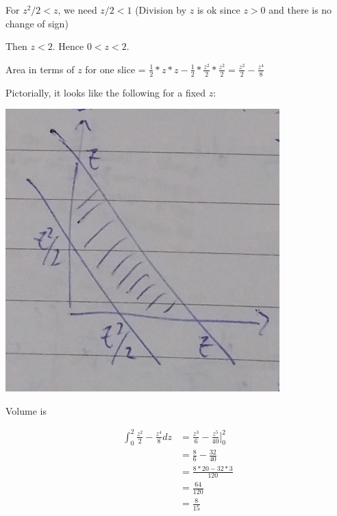 \documentclass[9pt]{article}
\begin{document}
For $z^2 / 2 < z$, we need $z / 2 < 1$ (Division by $z$ is ok since $z > 0$ and there is no change of sign)

Then $z < 2$. Hence $0 < z < 2$.

Area in terms of $z$ for one slice = $\frac{1}{2} * z * z - \frac{1}{2} * \frac{z^2}{2} * \frac{z^2}{2} = \frac{z^2}{2} - \frac{z^4}{8}$

Pictorially, it looks like the following for a fixed $z$:

\begin{center}
  \includegraphics[scale=0.5]{q3b.jpg}
\end{center}

Volume is

\begin{align*}
  \int_0^2 \frac{z^2}{2} - \frac{z^4}{8} dz &= \frac{z^3}{6} - \frac{z^5}{40}\bigg]_0^2 \\
  &= \frac{8}{6} - \frac{32}{40} \\
  &= \frac{8 * 20 - 32 * 3}{120} \\
  &= \frac{64}{120} \\
  &= \frac{8}{15}
\end{align*}
\end{document}
